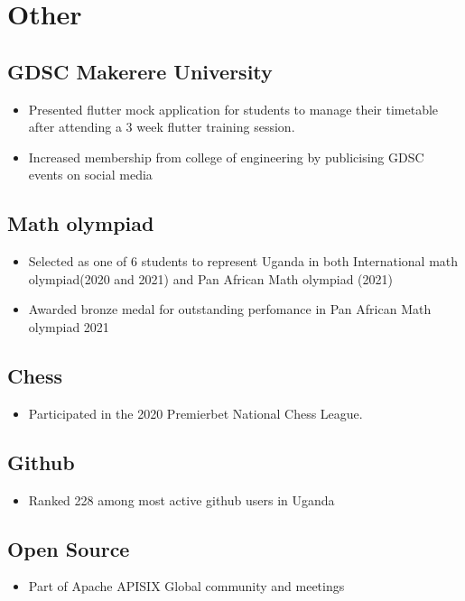 \documentclass[a4paper]{article}
\begin{document}
\begin{minipage}[t]{0.5\textwidth}
        \section*{Other}
        \subsection*{GDSC Makerere University}
        \begin{itemize}
            \item Presented flutter mock application for students to manage their timetable after attending a 3 week flutter training session.
            \item Increased membership from college of engineering by publicising GDSC events on social media
        \end{itemize}

        \subsection*{Math olympiad}
        \begin{itemize}
            \item Selected as one of 6 students to represent Uganda in both International math olympiad(2020 and 2021) and Pan African Math olympiad (2021)
            \item Awarded bronze medal for outstanding perfomance in Pan African Math olympiad 2021
        \end{itemize}

        \subsection*{Chess}
        \begin{itemize}
            \item Participated in the 2020 Premierbet National Chess League.
        \end{itemize}
        \subsection*{Github}
        \begin{itemize}
            \item Ranked 228 among most active github users in Uganda
        \end{itemize}
        \subsection*{Open Source}
        \begin{itemize}
            \item Part of Apache APISIX Global community and meetings
        \end{itemize}

\end{minipage}
\end{document}
